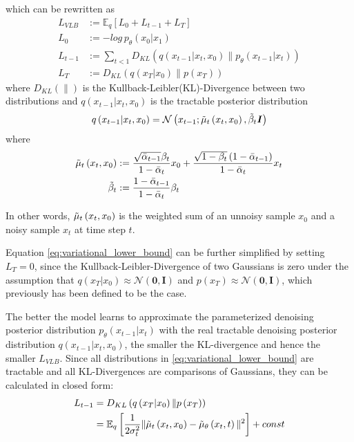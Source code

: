 which can be rewritten as
\begin{equation}
\label{eq:variational_lower_bound}
\begin{aligned}
L_{VLB} & := \mathbb{E}_{q}\left[L_{0} + L_{t-1} + L_{T}\right] \\
L_{0} & := -log\, p_{\theta}\left(x_{0}|x_{1}\right)\\
L_{t-1} & := \sum_{t<1}D_{KL}\left(q\left(x_{t-1}|x_t,x_0\right)\|p_{\theta}\left(x_{t-1}|x_t\right)\right)\\
L_{T} & := D_{KL}\left(q\left(x_{T}|x_0\right)\|p\left(x_{T}\right)\right)
\end{aligned}
\end{equation}
where $D_{KL}\left(\|\right)$ is the Kullback-Leibler(KL)-Divergence between two distributions and $q\left(x_{t-1}|x_t,x_0\right)$ is the tractable posterior distribution
\begin{equation}
q\left(x_{t-1}|x_t,x_0\right) = \mathcal{N}\left(x_{t-1};\Tilde{\mu}_t\left(x_t,x_0\right),\Tilde{\beta}_t\boldsymbol{I}\right)
\end{equation}
where
\begin{equation}
\begin{aligned}
\Tilde{\mu}_t\left(x_t,x_0\right) & := \frac{\sqrt{\bar{\alpha}_{t-1}}\beta_t}{1-\bar{\alpha}_{t}}x_0 + \frac{\sqrt{1-\beta_t}\left(1-\bar{\alpha}_{t-1}\right)}{1-\bar{\alpha}_{t}}x_t \\
\Tilde{\beta}_t & := \frac{1-\bar{\alpha}_{t-1}}{1-\bar{\alpha}_{t}}\beta_t
\end{aligned}
\end{equation}

In other words, $\Tilde{\mu}_t\left(x_t,x_0\right)$ is the weighted sum of an unnoisy sample $x_0$ and a noisy sample $x_t$ at time step $t$.

Equation \eqref{eq:variational_lower_bound} can be further simplified by setting $L_T=0$, since the Kullback-Leibler-Divergence of two Gaussians is zero under the assumption that $q\left(x_{T}|x_0\right) \approx \mathcal{N}\left(\boldsymbol{0},\boldsymbol{I}\right)$ and $p\left(x_{T}\right) \approx \mathcal{N}\left(\boldsymbol{0},\boldsymbol{I}\right)$, which previously has been defined to be the case.

The better the model learns to approximate the parameterized denoising posterior distribution $p_{\theta}\left(x_{t-1}|x_t\right)$ with the real tractable denoising posterior distribution $q\left(x_{t-1}|x_t,x_0\right)$, the smaller the KL-divergence and hence the smaller $L_{VLB}$.
Since all distributions in \eqref{eq:variational_lower_bound} are tractable and all KL-Divergences are comparisons of Gaussians, they can be calculated in closed form:
\begin{equation}
\label{eq:closed_form_lt-1}
\begin{aligned}
L_{t-1} & = D_{KL}\left(q\left(x_{T}|x_0\right)\|p\left(x_{T}\right)\right) \\
        & = \mathbb{E}_{q}\left[\frac{1}{2\sigma^2_t}\|\Tilde{\mu}_t\left(x_t,x_0\right)-\Tilde{\mu}_{\theta}\left(x_t,t\right)\|^2\right] + const
\end{aligned}
\end{equation}

